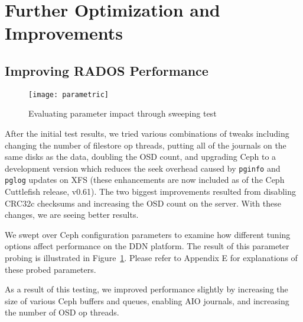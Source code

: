 \section{Further Optimization and Improvements}
\label{sec:ceph-tuning}

\subsection{Improving RADOS Performance}

\begin{figure}[h]
\centering
\texttt{[image: parametric]}
\caption{Evaluating parameter impact through sweeping test}
\label{fig:parametric}
\end{figure}


After the initial test results, we tried various combinations of tweaks
including changing the number of filestore op threads, putting all of the
journals on the same disks as the data, doubling the OSD count, and upgrading
Ceph to a development version which reduces the seek overhead caused by
\texttt{pginfo} and \texttt{pglog} updates on XFS (these enhancements are now
included as of the Ceph Cuttlefish release, v0.61).  The two biggest
improvements resulted from disabling CRC32c checksums and increasing the OSD
count on the server.  With these changes, we are seeing better results.

We swept over Ceph configuration parameters to examine how different tuning
options affect performance on the DDN platform. The result of this parameter
probing is illustrated in Figure~\ref{fig:parametric}. Please refer to Appendix
E for explanations of these probed parameters.


As a result of this testing, we improved performance slightly by
increasing the size of various Ceph buffers and queues, enabling AIO journals,
and increasing the number of OSD op threads.


